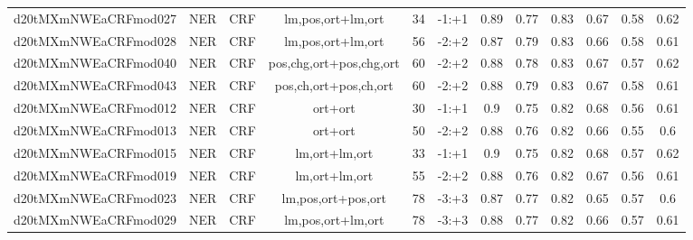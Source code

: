 \documentclass[a4paper]{article}
\begin{document}
\begin{landscape}
\begin{center}
\begin{tabular}{ |c|c|c|c|c|c|c|c|c|c|c|c|}
 
 	
 	\small{ d20tMXmNWEaCRFmod027 } & NER & CRF & lm,pos,ort+lm,ort  &  34 &  -1:+1  &  0.89 & 0.77 & 0.83  &  0.67 & 0.58 & 0.62 \\
 	

 
 	
 	\small{ d20tMXmNWEaCRFmod028 } & NER & CRF & lm,pos,ort+lm,ort  &  56 &  -2:+2  &  0.87 & 0.79 & 0.83  &  0.66 & 0.58 & 0.61 \\
 	

 
 	
 	\small{ d20tMXmNWEaCRFmod040 } & NER & CRF & pos,chg,ort+pos,chg,ort  &  60 &  -2:+2  &  0.88 & 0.78 & 0.83  &  0.67 & 0.57 & 0.62 \\
 	

 
 	
 	\small{ d20tMXmNWEaCRFmod043 } & NER & CRF & pos,ch,ort+pos,ch,ort  &  60 &  -2:+2  &  0.88 & 0.79 & 0.83  &  0.67 & 0.58 & 0.61 \\
 	

 
 	
 	\small{ d20tMXmNWEaCRFmod012 } & NER & CRF & ort+ort  &  30 &  -1:+1  &  0.9 & 0.75 & 0.82  &  0.68 & 0.56 & 0.61 \\
 	

 
 	
 	\small{ d20tMXmNWEaCRFmod013 } & NER & CRF & ort+ort  &  50 &  -2:+2  &  0.88 & 0.76 & 0.82  &  0.66 & 0.55 & 0.6 \\
 	

 
 	
 	\small{ d20tMXmNWEaCRFmod015 } & NER & CRF & lm,ort+lm,ort  &  33 &  -1:+1  &  0.9 & 0.75 & 0.82  &  0.68 & 0.57 & 0.62 \\
 	

 
 	
 	\small{ d20tMXmNWEaCRFmod019 } & NER & CRF & lm,ort+lm,ort  &  55 &  -2:+2  &  0.88 & 0.76 & 0.82  &  0.67 & 0.56 & 0.61 \\
 	

 
 	
 	\small{ d20tMXmNWEaCRFmod023 } & NER & CRF & lm,pos,ort+pos,ort  &  78 &  -3:+3  &  0.87 & 0.77 & 0.82  &  0.65 & 0.57 & 0.6 \\
 	

 
 	
 	\small{ d20tMXmNWEaCRFmod029 } & NER & CRF & lm,pos,ort+lm,ort  &  78 &  -3:+3  &  0.88 & 0.77 & 0.82  &  0.66 & 0.57 & 0.61 \\
 	
 \hline
\end{tabular}
\end{center}





\end{landscape}
\end{document}
